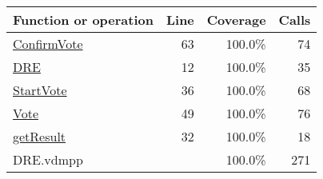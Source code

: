 \bigskip
\begin{longtable}{|l|r|r|r|}
\hline
Function or operation & Line & Coverage & Calls \\
\hline
\hline
\hyperref[ConfirmVote:63]{ConfirmVote} & 63&100.0\% & 74 \\
\hline
\hyperref[DRE:12]{DRE} & 12&100.0\% & 35 \\
\hline
\hyperref[StartVote:36]{StartVote} & 36&100.0\% & 68 \\
\hline
\hyperref[Vote:49]{Vote} & 49&100.0\% & 76 \\
\hline
\hyperref[getResult:32]{getResult} & 32&100.0\% & 18 \\
\hline
\hline
DRE.vdmpp & & 100.0\% & 271 \\
\hline
\end{longtable}

